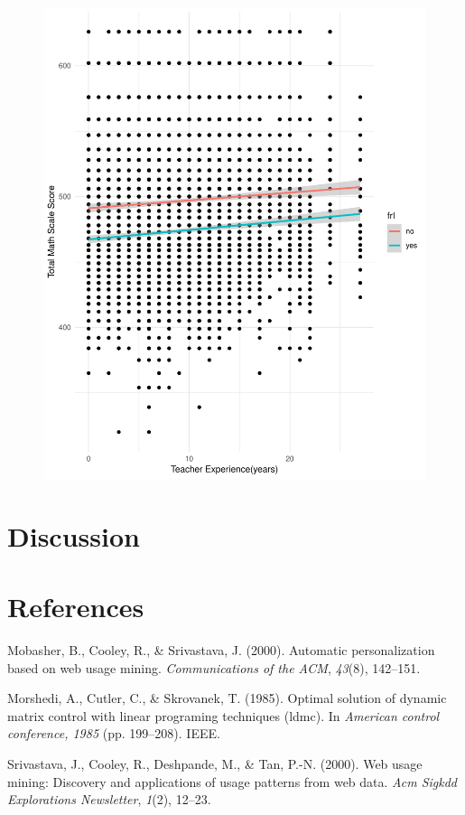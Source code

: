 \documentclass[man]{apa6}
\begin{document}
\begin{figure}
\centering
\includegraphics{lab8-Heidi-Jeongim-Jungah_files/figure-latex/Commit 5-1.pdf}
\caption{}
\end{figure}

\section{Discussion}\label{discussion}

\newpage

\section{References}\label{references}

\begingroup
\setlength{\parindent}{-0.5in} \setlength{\leftskip}{0.5in}

\hypertarget{refs}{}
\hypertarget{ref-mobasher2000automatic}{}
Mobasher, B., Cooley, R., \& Srivastava, J. (2000). Automatic
personalization based on web usage mining. \emph{Communications of the
ACM}, \emph{43}(8), 142--151.

\hypertarget{ref-morshedi1985optimal}{}
Morshedi, A., Cutler, C., \& Skrovanek, T. (1985). Optimal solution of
dynamic matrix control with linear programing techniques (ldmc). In
\emph{American control conference, 1985} (pp. 199--208). IEEE.

\hypertarget{ref-srivastava2000web}{}
Srivastava, J., Cooley, R., Deshpande, M., \& Tan, P.-N. (2000). Web
usage mining: Discovery and applications of usage patterns from web
data. \emph{Acm Sigkdd Explorations Newsletter}, \emph{1}(2), 12--23.

\endgroup
\end{document}
